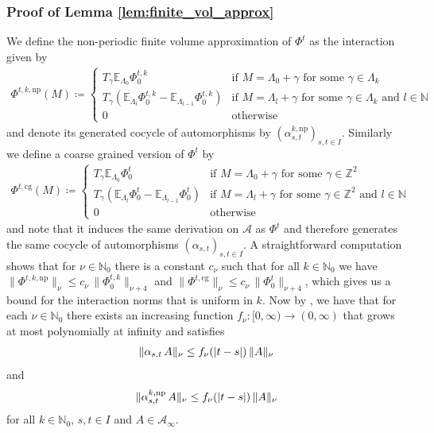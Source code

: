 \documentclass[a4paper]{article}
\newcommand{\E}{\mathbb{E}}
\renewcommand{\Phi}{\varPhi}
\newcommand{\g}{\gamma}
\newcommand{\La}{\Lambda}
\newcommand{\N}{\mathbb{N}}
\newcommand{\Z}{\mathbb{Z}}
\newcommand{\mA}{\mathcal{A}}
\DeclarePairedDelimiter\norm{\lVert}{\rVert}
\DeclarePairedDelimiter\abs{\lvert}{\rvert}
\theoremstyle{plain}
\theoremstyle{definition}
\theoremstyle{remark}
\renewcommand{\(}{\left(}
\renewcommand{\)}{\right)}
\begin{document}
\subsubsection{Proof of Lemma \ref{lem:finite_vol_approx}} \label{proof:finite_vol_approx}
    We define the non-periodic finite volume approximation of $\Phi^t$ as the interaction given by
    \begin{align*}
        \Phi^{t,k,\mathrm{np}}(M) \coloneq
        \left\{\begin{array}{cl}
        T_{\g}\E_{\La_{0}}\Phi^{t,k}_0 & \mbox{if  $M=\La_0 +\g$ for some $\g\in \Lambda_k$}\\
        T_{\g}(\E_{\La_{l}}\Phi^{t,k}_0 - \E_{\La_{l-1}}\Phi^{t,k}_0)&
        \mbox{if  $M=\La_l +\g$ for some $\g\in\Lambda_k$ and $l\in\N$}\\
        0 & \mbox{otherwise}
        \end{array}
        \right
        .
    \end{align*}
    and denote its generated cocycle of automorphisms by $(\alpha_{s,t}^{k,\mathrm{np}})_{s,t\in I}$. Similarly we define a coarse grained version of $\Phi^t$ by
    \begin{align*}
        \Phi^{t,\mathrm{cg}}(M) \coloneq
        \left\{\begin{array}{cl}
        T_{\g}\E_{\La_{0}}\Phi^{t}_0 & 
        \mbox{if  $M=\La_0 +\g$ for some $\g\in \Z^2$}\\
        T_{\g}(\E_{\La_{l}}\Phi^{t}_0 - \E_{\La_{l-1}}\Phi^{t}_0)&
        \mbox{if  $M=\La_l +\g$ for some $\g\in \Z^2$ and $l\in\N$}\\
        0 & \mbox{otherwise}
        \end{array}
        \right
        .
    \end{align*}
    and note that it induces the same derivation on $\mA$ as $\Phi^t$ and therefore generates the same cocycle of automorphisms $(\alpha_{s,t})_{s,t\in I}$. A straightforward computation shows that for  $\nu \in \N_0$ there is a constant $c_\nu$ such that for all $k\in \N_0$ we have $\lVert \Phi^{t,k,\mathrm{np}} \rVert_\nu \leq c_\nu\,\lVert \Phi_0^{t,k} \rVert_{\nu+4}$ and $\lVert \Phi^{t,\mathrm{cg}} \rVert_\nu \leq c_\nu\,\lVert \Phi_0^{t} \rVert_{\nu+4}$, which gives us a bound for the interaction norms that is uniform in $k$.
    Now by  \cite[Lemma 2.10]{BTW26automorphic}, we have that for each $\nu \in \N_0$ there exists an increasing function $f_\nu \colon [0,\infty) \to (0,\infty)$ that grows at most polynomially at infinity and satisfies
    \begin{align*}
        \norm{\alpha_{s,t} \, A}_\nu \leq f_\nu(\abs{t-s}) \, \norm{A}_\nu
    \end{align*}
    and
    \begin{align*}
        \norm{\alpha^{k,\mathrm{np}}_{s,t} \, A}_\nu \leq f_\nu(\abs{t-s}) \, \norm{A}_\nu
    \end{align*}
    for all $k\in \N_0$, $s,t\in I$ and $A\in \mA_\infty$.
    
\end{document}

